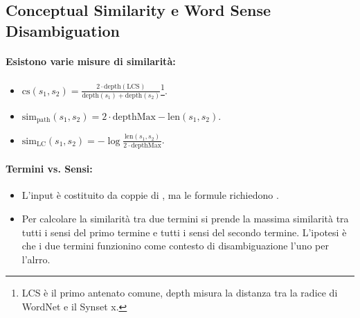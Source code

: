 \subsection{Conceptual Similarity e Word Sense Disambiguation}



\paragraph{Esistono varie misure di similarità:}

\begin{itemize}
  \item {} $\text{cs}(s_1, s_2) = \frac{2 \cdot \text{depth}(\text{LCS})}{\text{depth}(s_1) + \text{depth}(s_2)}$\footnote{LCS è il primo antenato comune, depth misura la distanza tra la radice di WordNet e il Synset x.}.
  \item {} $\text{sim}_{\text{path}}(s_1, s_2) = 2 \cdot \text{depthMax} - \text{len}(s_1, s_2)$.
  \item {} $\text{sim}_{\text{LC}}(s_1, s_2) = -\log \frac{\text{len}(s_1, s_2)}{2 \cdot \text{depthMax}}$.
\end{itemize}

\paragraph{Termini vs. Sensi:}

\begin{itemize}
  \item L'input è costituito da coppie di , ma le formule richiedono .
  \item Per calcolare la similarità tra due termini si prende la massima similarità tra tutti i sensi del primo termine e tutti i sensi del secondo termine. L'ipotesi è che i due termini funzionino come contesto di disambiguazione l'uno per l'alrro.
\end{itemize}


